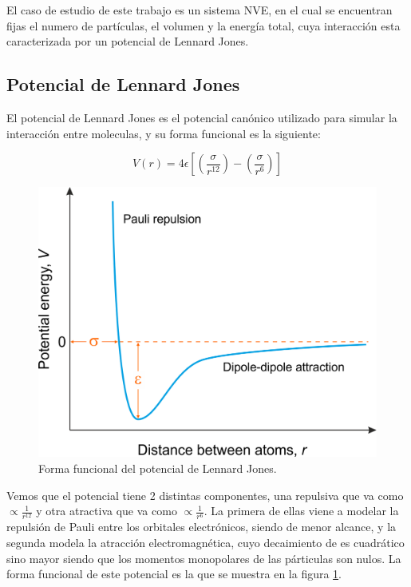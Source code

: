 \documentclass[%
 reprint,
 amsmath,amssymb,
 aps,
]{revtex4-1}
\begin{document}
El caso de estudio de este trabajo es un sistema NVE, en el cual se encuentran
fijas el numero de part\'iculas, el volumen y la energ\'ia total, cuya
interacci\'on esta caracterizada por un potencial de Lennard Jones.

\subsection{Potencial de Lennard Jones}

El potencial de Lennard Jones es el potencial can\'onico utilizado para simular
la interacci\'on entre moleculas, y su forma funcional es la siguiente:

\begin{equation}
  V(r) = 4 \epsilon \left[ \left( \frac{\sigma}{r ^ {12}}\right) - \left( \frac{\sigma}{r ^ 6} \right) \right]
\end{equation}

\begin{figure}
  \begin{center}
  \includegraphics[scale=0.62]{images/lj_potential.png}
  \caption{Forma funcional del potencial de Lennard Jones.}
  \label{lj_potential}
\end{center}
\end{figure}

Vemos que el potencial tiene 2 distintas componentes, una repulsiva que va
como $\propto \frac{1}{r ^ 12}$ y otra atractiva que va como
$\propto \frac{1}{r ^ 6}$. La primera de ellas viene a modelar la repulsi\'on de
Pauli entre los orbitales electr\'onicos, siendo de menor alcance, y la segunda
modela la atracci\'on electromagn\'etica, cuyo decaimiento de es cuadr\'atico
sino mayor siendo que los momentos monopolares de las p\'articulas son nulos.
La forma funcional de este potencial es la que se muestra en la figura
\ref{lj_potential}.
\end{document}
